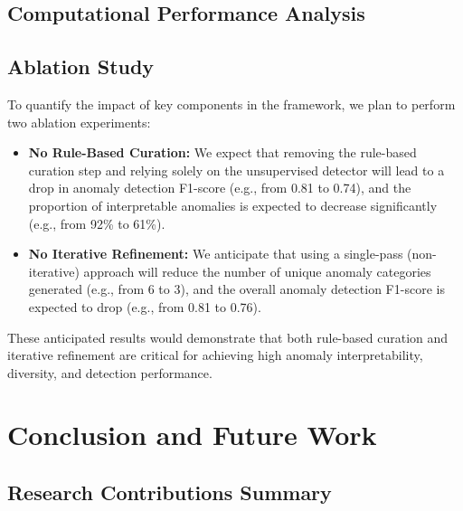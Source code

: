 \documentclass[runningheads]{llncs}
\begin{document}
\subsection{Computational Performance Analysis}
\label{sec:performance}

\begin{compactoutline}
\end{compactoutline}

\subsection{Ablation Study}
\label{sec:ablation}

To quantify the impact of key components in the framework, we plan to perform two ablation experiments:
\begin{itemize}
    \item \textbf{No Rule-Based Curation:} We expect that removing the rule-based curation step and relying solely on the unsupervised detector will lead to a drop in anomaly detection F1-score (e.g., from 0.81 to 0.74), and the proportion of interpretable anomalies is expected to decrease significantly (e.g., from 92\% to 61\%).
    \item \textbf{No Iterative Refinement:} We anticipate that using a single-pass (non-iterative) approach will reduce the number of unique anomaly categories generated (e.g., from 6 to 3), and the overall anomaly detection F1-score is expected to drop (e.g., from 0.81 to 0.76).
\end{itemize}
These anticipated results would demonstrate that both rule-based curation and iterative refinement are critical for achieving high anomaly interpretability, diversity, and detection performance.

\section{Conclusion and Future Work}
\label{sec:conclusion}

\subsection{Research Contributions Summary}

\begin{compactoutline}
\end{compactoutline}
\end{document}
